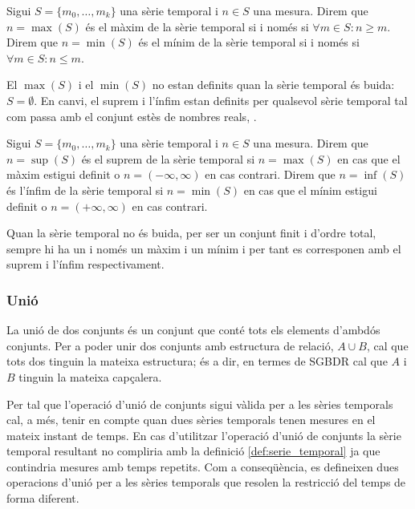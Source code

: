 \begin{definition}
  Sigui $S=\{m_0,\ldots,m_k\}$ una sèrie temporal i $n\in S$ una
  mesura.  Direm que $n=\max(S)$ és el màxim de la sèrie temporal si i
  només si $\forall m \in S: n \geq m $.  Direm que $n=\min(S)$ és el
  mínim de la sèrie temporal si i només si $\forall m \in S: n \leq
  m$.
\end{definition}

El $\max(S)$ i el $\min(S)$ no estan definits quan la sèrie temporal
és buida: $S= \emptyset$. En
canvi, el suprem i l'ínfim estan definits per qualsevol
sèrie temporal tal com passa amb el conjunt estès de nombres reals,
\cite{cantrell:extendedreal}.  

\begin{definition}\label{def:sgst:sup}\label{def:sgst:inf}
  Sigui $S=\{m_0,\ldots,m_k\}$ una sèrie temporal i $n\in S$ una
  mesura.  Direm que $n=\sup(S)$ és el suprem de la sèrie temporal si
  $n=\max(S)$ en cas que el màxim estigui definit o
  $n=(-\infty,\infty)$ en cas contrari.  Direm que $n=\inf(S)$ és
  l'ínfim de la sèrie temporal si $n=\min(S)$ en cas que el mínim
  estigui definit o $n=(+\infty,\infty)$ en cas contrari.
\end{definition}

Quan la sèrie temporal no és buida, per
ser un conjunt finit i d'ordre total, sempre hi ha un i només un màxim
i un mínim i per tant es corresponen amb el suprem i l'ínfim
respectivament.




\subsubsection{Unió}

La unió de dos conjunts és un conjunt que conté tots els elements
d'ambdós conjunts.  Per a poder unir dos conjunts amb estructura de
relació, $A \cup B$, cal que tots dos tinguin la mateixa estructura;
és a dir, en termes de SGBDR cal que $A$ i $B$ tinguin la mateixa
capçalera.

Per tal que l'operació d'unió de conjunts sigui vàlida per a les
sèries temporals cal, a més, tenir en compte quan dues sèries
temporals tenen mesures en el mateix instant de temps. En cas
d'utilitzar l'operació d'unió de conjunts la sèrie temporal resultant
no compliria amb la definició \ref{def:serie_temporal} ja que
contindria mesures amb temps repetits. Com a conseqüència, es
defineixen dues operacions d'unió per a les sèries temporals que
resolen la restricció del temps de forma diferent.

